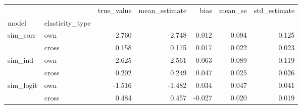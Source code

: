 \begin{tabular}{llrrrrr}
\toprule
 &  & true_value & mean_estimate & bias & mean_se & std_estimate \\
model & elasticity_type &  &  &  &  &  \\
\midrule
\multirow[t]{2}{*}{sim_corr} & own & -2.760 & -2.748 & 0.012 & 0.094 & 0.125 \\
 & cross & 0.158 & 0.175 & 0.017 & 0.022 & 0.023 \\
\cline{1-7}
\multirow[t]{2}{*}{sim_ind} & own & -2.625 & -2.561 & 0.063 & 0.089 & 0.119 \\
 & cross & 0.202 & 0.249 & 0.047 & 0.025 & 0.026 \\
\cline{1-7}
\multirow[t]{2}{*}{sim_logit} & own & -1.516 & -1.482 & 0.034 & 0.047 & 0.041 \\
 & cross & 0.484 & 0.457 & -0.027 & 0.020 & 0.019 \\
\cline{1-7}
\bottomrule
\end{tabular}
